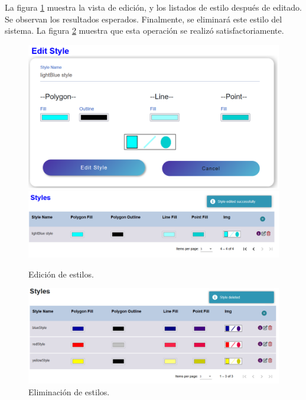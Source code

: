 La figura \ref{estilo} muestra la vista de edici\'on, y los listados de estilo despu\'es de editado. Se observan los resultados esperados. Finalmente, se eliminar\'a este estilo del sistema. La figura \ref{deleteStyle} muestra que esta operaci\'on se realiz\'o satisfactoriamente.

\begin{figure}[h]
\centering
\label{estilo}
\includegraphics[scale=0.3]{images/editStyle.png} 
\includegraphics[scale=0.3]{images/listStyle.png} 
\caption{Edici\'on de estilos.}
\end{figure}

\begin{figure}[h]
\centering
\label{deleteStyle} 
\includegraphics[scale=0.3]{images/deleteStyle.png} 
\caption{Eliminaci\'on de estilos.}
\end{figure}






